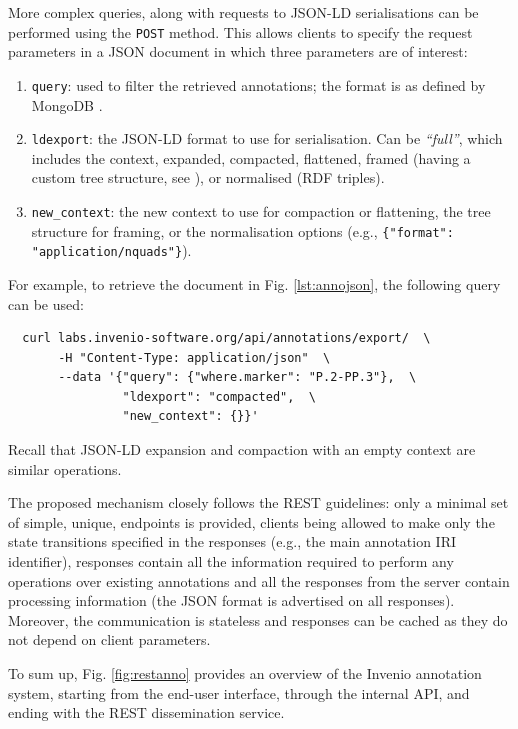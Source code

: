 More complex queries, along with requests to JSON-LD serialisations can be
performed using the \texttt{POST} method. This allows clients to specify the
request parameters in a JSON document in which three parameters are of interest:
\begin{enumerate}
  \item \texttt{query}: used to filter the retrieved annotations; the format is
                        as defined by MongoDB \cite{ref:mongo}.
  \item \texttt{ldexport}: the JSON-LD format to use for serialisation. Can be
                           \textit{``full''}, which includes the context,
                           expanded, compacted, flattened, framed (having a
                           custom tree structure, see \cite{ref:jsonldframe}),
                           or normalised (RDF triples).
  \item \texttt{new\_context}: the new context to use for compaction or
                               flattening, the tree structure for framing, or
                               the normalisation options (e.g.,
                               \texttt{\{"format": "application/nquads"\}}).
\end{enumerate}

For example, to retrieve the document in Fig. \ref{lst:annojson}, the following
query can be used:
\begin{verbatim}
  curl labs.invenio-software.org/api/annotations/export/  \
       -H "Content-Type: application/json"  \
       --data '{"query": {"where.marker": "P.2-PP.3"},  \
                "ldexport": "compacted",  \
                "new_context": {}}'
\end{verbatim}
Recall that JSON-LD expansion and compaction with an empty context are similar
operations.

The proposed mechanism closely follows the REST guidelines: only a minimal set
of simple, unique, endpoints is provided, clients being allowed to make only
the state transitions specified in the responses (e.g., the main annotation IRI
identifier), responses contain all the information required to perform any
operations over existing annotations and all the responses from the server
contain processing information (the JSON format is advertised on all
responses).  Moreover, the communication is stateless and responses can be
cached as they do not depend on client parameters.

To sum up, Fig. \ref{fig:restanno} provides an overview of the Invenio
annotation system, starting from the end-user interface, through the internal
API, and ending with the REST dissemination service.

